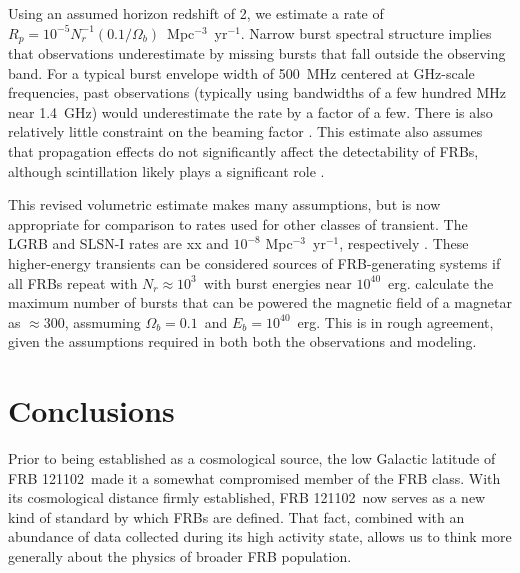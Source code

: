\documentclass[twocolumn]{aastex61}
\newcommand{\frb}{FRB 121102}
\begin{document}
Using an assumed horizon redshift of 2, we estimate a rate of $R_p = 10^{-5} N_r^{-1} (0.1/\Omega_b)$\ Mpc$^{-3}$\ yr$^{-1}$. Narrow burst spectral structure implies that observations underestimate by missing bursts that fall outside the observing band. For a typical burst envelope width of 500~MHz centered at GHz-scale frequencies, past observations (typically using bandwidths of a few hundred MHz near 1.4~GHz) would underestimate the rate by a factor of a few. There is also relatively little constraint on the beaming factor \citep[$\sim0.1$ for pulsars;][]{1998MNRAS.298..625T}. This estimate also assumes that propagation effects do not significantly affect the detectability of FRBs, although scintillation likely plays a significant role \citep{2015MNRAS.451.3278M, CORDES}.

This revised volumetric estimate makes many assumptions, but is now appropriate for comparison to rates used for other classes of transient. The LGRB and SLSN-I rates are {\color{red}xx} and $10^{-8}$ Mpc$^{-3}$\ yr$^{-1}$, respectively \citep{?,2012Sci...337..927G}. These higher-energy transients can be considered sources of FRB-generating systems if all FRBs repeat with $N_r\approx10^3$\ with burst energies near $10^{40}$\ erg. \citep{2017arXiv170102370M} calculate the maximum number of bursts that can be powered the magnetic field of a magnetar as $\approx300$, assmuming $\Omega_b=0.1$\ and $E_b=10^{40}$\ erg. This is in rough agreement, given the assumptions required in both both the observations and modeling.


\section{Conclusions}
Prior to being established as a cosmological source, the low Galactic latitude of \frb\ made it a somewhat compromised member of the FRB class. With its cosmological distance firmly established, \frb\ now serves as a new kind of standard by which FRBs are defined. That fact, combined with an abundance of data collected during its high activity state, allows us to think more generally about the physics of broader FRB population.
\end{document}
